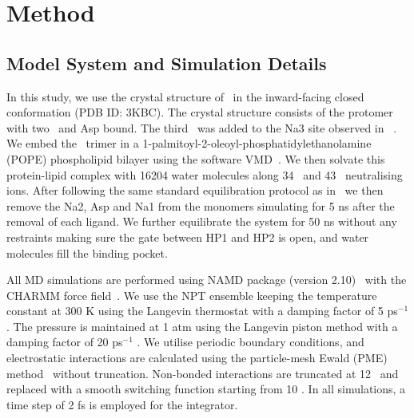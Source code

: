 \section{Method}
\subsection{Model System and Simulation Details}
In this study, we use the crystal structure of \GltPh\ in the inward-facing closed conformation 
(PDB ID: 3KBC). The crystal structure consists of the protomer with two \Na\ and Asp bound. The 
third \Na\ was added to the Na3 site observed in \GltTk~\cite{Guskov2016}. We embed the \GltPh\ 
trimer in a 1-palmitoyl-2-oleoyl-phosphatidylethanolamine (POPE) phospholipid bilayer using the 
software VMD~\cite{Humphrey1996}. We then solvate this protein-lipid complex with 16204 water 
molecules along 34 \Na\ and 43 \Cl\ neutralising ions. After following the same standard 
equilibration protocol as in~\cite{Heinzelmann2013} we then remove the Na2, Asp and Na1 from the 
monomers simulating for 5 ns after the removal of each ligand. We further equilibrate the system 
for 50 ns without any restraints making sure the gate between HP1 and HP2 is open, and water 
molecules fill the binding pocket.

All MD simulations are performed using NAMD package (version 2.10)~\cite{Phillips2005} with the 
CHARMM force field~\cite{Klauda2012}. We use the NPT ensemble keeping the temperature constant 
at 300 K using the Langevin thermostat with a damping factor of 5 ps$^{-1}$. The pressure is 
maintained at 1 atm using the Langevin piston method with a damping factor of 20 ps$^{-1}$ 
\cite{Feller1995}. We utilise periodic boundary conditions, and electrostatic interactions are 
calculated using the particle-mesh Ewald (PME) method~\cite{Darden1993} without truncation. 
Non-bonded interactions are truncated at 12 \angs\ and replaced with a smooth switching function 
starting from 10 \angs. In all simulations, a time step of 2 fs is employed for the integrator.

